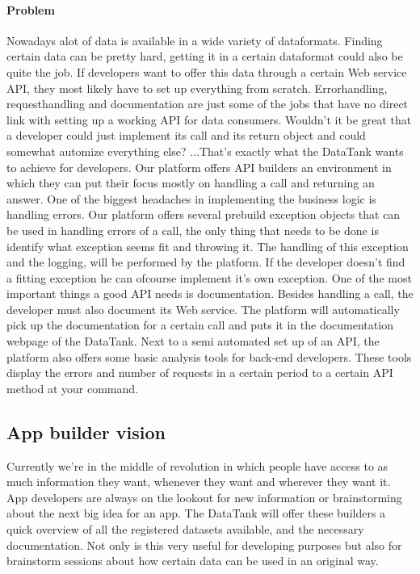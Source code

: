 \documentclass[12pt]{article}
\begin{document}
\paragraph{Problem}
\npar Nowadays alot of data is available in a wide variety of dataformats. Finding certain data can be pretty hard, getting it in a certain dataformat could also be quite the job. If developers want to offer this data through a certain Web service API, they most likely have to set up everything from scratch. Errorhandling, requesthandling and documentation are just some of the jobs that have no direct link with setting up a working API for data consumers. Wouldn't it be great that a developer could just implement its call and its return object and could somewhat automize everything else? ...That's exactly what the DataTank wants to achieve for developers.
\npar Our platform offers API builders an environment in which they can put their focus mostly on handling a call and returning an answer. One of the biggest headaches in implementing the business logic is handling errors. Our platform offers several prebuild exception objects that can be used in handling errors of a call, the only thing that needs to be done is identify what exception seems fit and throwing it. The handling of this exception and the logging, will be performed by the platform. If the developer doesn't find a fitting exception he can ofcourse implement it's own exception.
\npar One of the most important things a good API needs is documentation. Besides handling a call, the developer must also document its Web service. The platform will automatically pick up the documentation for a certain call and puts it in the documentation webpage of the DataTank.
\npar Next to a semi automated set up of an API, the platform also offers some basic analysis tools for back-end developers. These tools display the errors and number of requests in a certain period to a certain API method at your command.

\subsection{App builder vision }
Currently we're in the middle of revolution in which people have access to as much information they want, whenever they want and wherever they want it. App developers are always on the lookout for new information or brainstorming about the next big idea for an app. The DataTank will offer these builders a quick overview of all the registered datasets available, and the necessary documentation. Not only is this very useful for developing purposes but also for brainstorm sessions about how certain data can be used in an original way.
\end{document}
